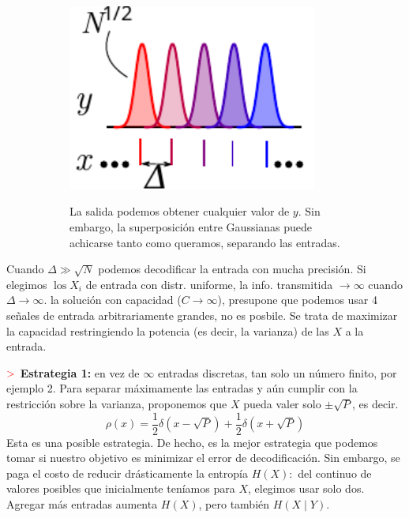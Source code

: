 \documentclass[%
 reprint,
 amsmath,amssymb,
 aps,
]{revtex4-1}
\begin{document}
\begin{figure}[!ht]
  \begin{subfigure}{0.2\textwidth}
    \centering
    \includegraphics[width = 0.9\textwidth]{canalGaussiano.pdf}
  \end{subfigure}\qquad
  \begin{subfigure}{0.2\textwidth}
    La salida podemos obtener cualquier valor de $y$. Sin embargo, la superposición entre Gaussianas puede
    achicarse tanto como queramos, separando las entradas. 
  \end{subfigure}
\end{figure}
Cuando $\Delta \gg \sqrt{N}$ podemos
decodificar la entrada con mucha precisión. 
Si elegimos $\operatorname{los} X_{i}$ de entrada con distr. uniforme, la info. transmitida $\rightarrow \infty$ cuando $\Delta \rightarrow \infty$. 
la solución con capacidad ($C\rightarrow \infty$), presupone que podemos usar 4 señales de entrada arbitrariamente grandes, no es posbile. Se trata de maximizar la capacidad restringiendo la potencia (es decir, la varianza) de las $X$ a la entrada. 

\textbf{$\textcolor{red}{\mathbf{>}}$ Estrategia 1:}
en vez de $\infty$ entradas discretas, tan solo un número finito, por
ejemplo 2. Para separar máximamente las entradas y aún cumplir con la restricción sobre la varianza, proponemos que $X$ pueda valer solo $\pm \sqrt{P}$, es decir.
$$
\rho(x)=\frac{1}{2} \delta(x-\sqrt{P})+\frac{1}{2} \delta(x+\sqrt{P})
$$
Esta es una posible estrategia. De hecho, es la mejor estrategia que podemos tomar si nuestro objetivo
es minimizar el error de decodificación. Sin embargo, se paga el costo de reducir drásticamente la entropía $H(X):$ del continuo de valores posibles que inicialmente teníamos para $X$, elegimos usar solo
dos. Agregar más entradas aumenta $H(X)$, pero también $H(X \mid Y)$.
\end{document}

